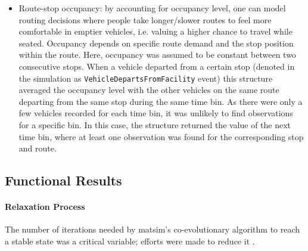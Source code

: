 \begin{itemize}
%
\item Route-stop occupancy: by accounting for occupancy level, one can model routing decisions where people take longer/slower routes to feel more comfortable in emptier vehicles, i.e. valuing a higher chance to travel while seated. Occupancy depends on specific route demand and the stop position within the route. Here, occupancy was assumed to be constant between two consecutive stops. When a vehicle departed from a certain stop (denoted in the simulation as \lstinline|VehicleDepartsFromFacility| event) this structure averaged the occupancy level with the other vehicles on the same route departing from the same stop during the same time bin. As there were only a few vehicles  recorded for each time bin, it was unlikely to find observations for a specific bin. In this case, the structure returned the value of the next time bin, where at least one observation was found for the corresponding stop and route.
\end{itemize}

\subsection{Functional Results}
\paragraph{Relaxation Process}

The number of iterations needed by \gls{matsim}'s co-evolutionary algorithm to reach a stable state was a critical variable; efforts were made to reduce it \citep{%
MeisterBalmerEtc2006planomatIatbr,FourieEtAl_TRR_2013}.

